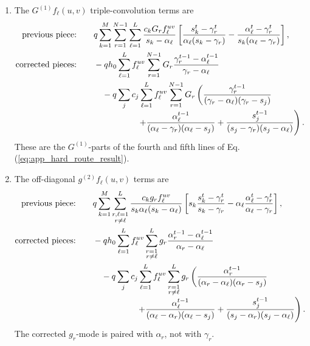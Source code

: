 \documentclass[superscriptaddress, amsmath, amssymb, aps, pre, floatfix]{revtex4-2}
\begin{document}
\begin{enumerate}
\item The \(G^{(1)}f_\ell(u,v)\) triple-convolution terms are
\begin{align*}
\text{previous piece:}\qquad
&q\sum_{k=1}^{M}\sum_{r=1}^{N-1}\sum_{\ell=1}^{L}
\frac{c_kG_rf_\ell^{uv}}{s_k-\alpha_\ell}
\left[
\frac{s_k^t-\gamma_r^t}{\alpha_\ell(s_k-\gamma_r)}
-\frac{\alpha_\ell^t-\gamma_r^t}{s_k(\alpha_\ell-\gamma_r)}
\right],
\nonumber\\
\text{corrected pieces:}\qquad
&-q h_0\sum_{\ell=1}^{L}f_\ell^{uv}
\sum_{r=1}^{N-1}G_r
\frac{\gamma_r^{t-1}-\alpha_\ell^{t-1}}{\gamma_r-\alpha_\ell}
\nonumber\\
&\quad
-q\sum_j c_j\sum_{\ell=1}^{L}f_\ell^{uv}
\sum_{r=1}^{N-1}G_r
\left(
\frac{\gamma_r^{t-1}}{(\gamma_r-\alpha_\ell)(\gamma_r-s_j)}
\right.
\nonumber\\[-1mm]
&\hspace{18mm}\left.
+\frac{\alpha_\ell^{t-1}}{(\alpha_\ell-\gamma_r)(\alpha_\ell-s_j)}
+\frac{s_j^{t-1}}{(s_j-\gamma_r)(s_j-\alpha_\ell)}
\right).
\end{align*}
These are the \(G^{(1)}\)-parts of the fourth and fifth lines of Eq. (\ref{eq:app_hard_route_result}).

\item The off-diagonal \(g^{(2)}f_\ell(u,v)\) terms are
\begin{align*}
\text{previous piece:}\qquad
&q\sum_{k=1}^{M}
\sum_{\substack{r,\ell=1\\ r\neq\ell}}^{L}
\frac{c_kg_rf_\ell^{uv}}{s_k\alpha_\ell(s_k-\alpha_\ell)}
\left[
s_k\frac{s_k^t-\gamma_r^t}{s_k-\gamma_r}
-\alpha_\ell\frac{\alpha_\ell^t-\gamma_r^t}{\alpha_\ell-\gamma_r}
\right],
\nonumber\\
\text{corrected pieces:}\qquad
&-q h_0\sum_{\ell=1}^{L}f_\ell^{uv}
\sum_{\substack{r=1\\ r\neq\ell}}^{L}
g_r
\frac{\alpha_r^{t-1}-\alpha_\ell^{t-1}}{\alpha_r-\alpha_\ell}
\nonumber\\
&\quad
-q\sum_j c_j\sum_{\ell=1}^{L}f_\ell^{uv}
\sum_{\substack{r=1\\ r\neq\ell}}^{L}
g_r
\left(
\frac{\alpha_r^{t-1}}{(\alpha_r-\alpha_\ell)(\alpha_r-s_j)}
\right.
\nonumber\\[-1mm]
&\hspace{18mm}\left.
+\frac{\alpha_\ell^{t-1}}{(\alpha_\ell-\alpha_r)(\alpha_\ell-s_j)}
+\frac{s_j^{t-1}}{(s_j-\alpha_r)(s_j-\alpha_\ell)}
\right).
\end{align*}
The corrected \(g_r\)-mode is paired with \(\alpha_r\), not with \(\gamma_r\).


\end{enumerate}
\end{document}
